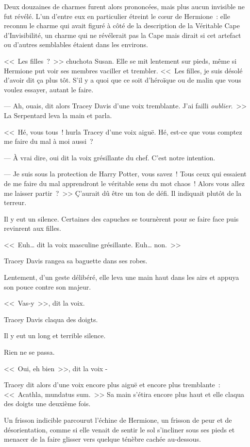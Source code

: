 Deux douzaines de charmes furent alors prononcées, mais plus aucun invisible ne fut révélé. L'un d'entre eux en particulier étreint le cœur de Hermione~: elle reconnu le charme qui avait figuré à côté de la description de la Véritable Cape d'Invisibilité, un charme qui ne révélerait pas la Cape mais dirait si cet artefact ou d'autres semblables étaient dans les environs.

<<~Les filles~?~>> chuchota Susan. Elle se mit lentement sur pieds, même si Hermione put voir ses membres vaciller et trembler. <<~Les filles, je suis désolé d'avoir dit ça plus tôt. S'il y a quoi que ce soit d'héroïque ou de malin que vous voulez essayer, autant le faire.

--- Ah, ouais, dit alors Tracey Davis d'une voix tremblante. J'ai failli \emph{oublier}.~>> La Serpentard leva la main et parla.

<<~Hé, vous tous~! hurla Tracey d'une voix aiguë. Hé, est-ce que vous comptez me faire du mal à moi aussi~?

--- À vrai dire, oui dit la voix grésillante du chef. C'est notre intention.

--- Je suis sous la protection de Harry Potter, vous savez~! Tous ceux qui essaient de me faire du mal apprendront le véritable sens du mot chaos~! Alors vous allez me laisser partir~?~>> Ç'aurait dû être un ton de défi. Il indiquait plutôt de la terreur.

Il y eut un silence. Certaines des capuches se tournèrent pour se faire face puis revinrent aux filles.

<<~Euh… dit la voix masculine grésillante. Euh… non.~>>

Tracey Davis rangea sa baguette dans ses robes.

Lentement, d'un geste délibéré, elle leva une main haut dans les airs et appuya son pouce contre son majeur.

<<~Vas-y~>>, dit la voix.

Tracey Davis claqua des doigts.

Il y eut un long et terrible silence.

Rien ne se passa.

<<~Oui, eh bien~>>, dit la voix -

Tracey dit alors d'une voix encore plus aiguë et encore plus tremblante~: <<~Acathla, mundatus sum.~>> Sa main s'étira encore plus haut et elle claqua des doigts une deuxième fois.

Un frisson indicible parcourut l'échine de Hermione, un frisson de peur et de désorientation, comme si elle venait de sentir le sol s'incliner sous ses pieds et menacer de la faire glisser vers quelque ténèbre cachée au-dessous.

